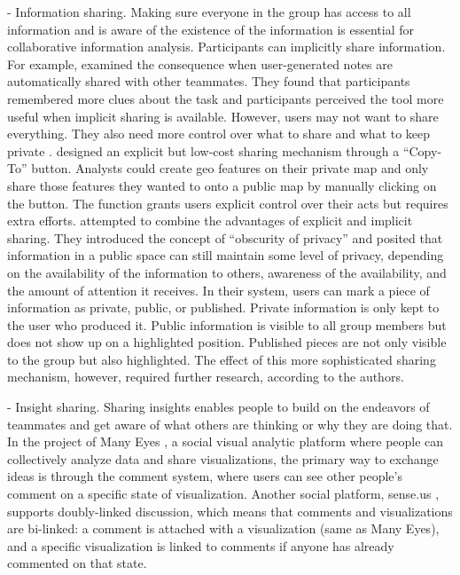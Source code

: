 - Information sharing. Making sure everyone in the group has access to all information and is aware of the existence of the information is essential for collaborative information analysis. Participants can implicitly share information. For example, \cite{Goyal2014} examined the consequence when user-generated notes are automatically shared with other teammates. They found that participants remembered more clues about the task and participants perceived the tool more useful when implicit sharing is available. However, users may not want to share everything. They also need more control over what to share and what to keep private \citep{Mahyar2013b}. \cite{Convertino2011} designed an explicit but low-cost sharing mechanism through a “Copy-To” button. Analysts could create geo features on their private map and only share those features they wanted to onto a public map by manually clicking on the button. The function grants users explicit control over their acts but requires extra efforts. \cite{Nobarany2012} attempted to combine the advantages of explicit and implicit sharing. They introduced the concept of “obscurity of privacy” and posited that information in a public space can still maintain some level of privacy, depending on the availability of the information to others, awareness of the availability, and the amount of attention it receives. In their system, users can mark a piece of information as private, public, or published. Private information is only kept to the user who produced it. Public information is visible to all group members but does not show up on a highlighted position. Published pieces are not only visible to the group but also highlighted. The effect of this more sophisticated sharing mechanism, however, required further research, according to the authors. 

- Insight sharing. Sharing insights enables people to build on the endeavors of teammates and get aware of what others are thinking or why they are doing that. In the project of Many Eyes \citep{Viegas2007}, a social visual analytic platform where people can collectively analyze data and share visualizations, the primary way to exchange ideas is through the comment system, where users can see other people’s comment on a specific state of visualization. Another social platform, sense.us \citep{Heer2008a}, supports doubly-linked discussion, which means that comments and visualizations are bi-linked: a comment is attached with a visualization (same as Many Eyes), and a specific visualization is linked to comments if anyone has already commented on that state. 

